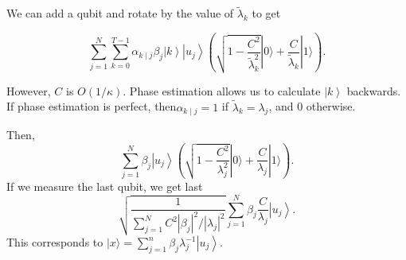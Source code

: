 \documentclass[b5paper,papersize,dvipdfmx,fleqn]{article}
\begin{document}
We can add a qubit and rotate by the value of $\tilde{\lambda}_{k}$ to get

$$
\sum_{j=1}^{N} \sum_{k=0}^{T-1} \alpha_{k \mid j} \beta_{j}\left|k\right\rangle\left|u_{j}\right\rangle\left(\sqrt{1-\frac{C^{2}}{\tilde{\lambda}_{k}^{2}}}|0\rangle+\frac{C}{\tilde{\lambda}_{k}}|1\rangle\right) .
$$

However, $C$ is $O(1 / \kappa)$. Phase estimation allows us to calculate $\left|k\right\rangle $ backwards. If phase estimation is perfect, then$\alpha_{k \mid j}=1$ if $\tilde{\lambda}_{k}=\lambda_{j}$, and 0 otherwise.

Then,
$$
\sum_{j=1}^{N} \beta_{j}\left|u_{j}\right\rangle\left(\sqrt{1-\frac{C^{2}}{\lambda_{j}^{2}}}|0\rangle+\frac{C}{\lambda_{j}}|1\rangle\right)
.$$
If we measure the last qubit, we get last
$$
\sqrt{\frac{1}{\sum_{j=1}^{N} C^{2}\left|\beta_{j}\right|^{2} /\left|\lambda_{j}\right|^{2}}} \sum_{j=1}^{N} \beta_{j} \frac{C}{\lambda_{j}}\left|u_{j}\right\rangle.
$$
This corresponds to $|x\rangle=\sum_{j=1}^{n}\beta_{j}\lambda_{j}^{-1}\left|u_{j}\right\rangle$.
\end{document}
